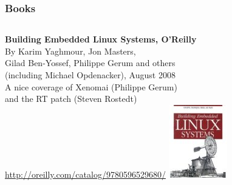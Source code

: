 \begin{frame}
  \frametitle{Books}
  \begin{columns}[T]
    {\bf Building Embedded Linux Systems, O'Reilly}\\
    \vspace{0.5cm}
    By Karim Yaghmour, Jon Masters,\\
    Gilad Ben-Yossef, Philippe Gerum and others\\
    (including Michael Opdenacker), August 2008\\
    \vspace{1cm}
    A nice coverage of Xenomai (Philippe Gerum)\\
    and the RT patch (Steven Rostedt)\\
    \vspace{0.5cm}
    \url{http://oreilly.com/catalog/9780596529680/}
    \includegraphics[width=\textwidth]{slides/sysdev-realtime/building-embedded-linux-systems.png}
  \end{columns}
\end{frame}

